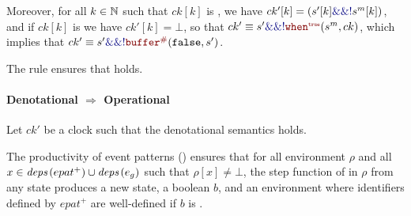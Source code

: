 \begin{skippableproof}
    Moreover, for all $k \in \mathbb{N}$ such that $ck[k]$ is \true, we have $ck'[k] = (s'[k]
        \kwf{\&\&} \kwf{!} s^m[k])$, and if $ck[k]$ is \false we have $ck'[k] = \bot$, so that
    $ck' \equiv s'\kwf{\&\&} \kwf{!}\whenT{s^m}{ck}$,
    which implies that $ck' \equiv s' \kwf{\&\&} \kwf{!} \buffer{\false}{s'}$.

    The rule  ensures that 
    holds.

    \paragraph{Denotational $\Rightarrow$ Operational}
    Let $ck'$ be a clock such that the denotational semantics  holds.

    The productivity of \GRSync event patterns ()
    ensures that for all environment $\rho$ and all $x \in {\ensuremath{\textit{deps}\left(epat^+\right)}} \cup {\ensuremath{\textit{deps}\left(e_g\right)}}$ such that
    $\rho[x] \neq \bot$, the step function of  in $\rho$ from any state
    produces a new state, a boolean $b$, and an environment where identifiers defined by $epat^+$
    are well-defined if $b$ is \true.


\end{skippableproof}
